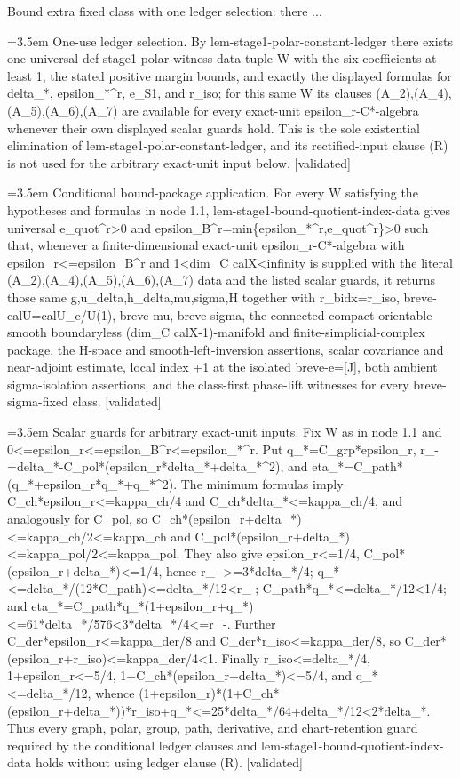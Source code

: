 \documentclass{article}
\newcommand{\step}[1]{\par\noindent\hangindent=3.5em\hangafter=1%
  \makebox[3.5em][l]{\textbf{#1.}}}
\newcommand{\steptag}[1]{\hfill{\small\textsf{[#1]}}}
\begin{document}
\begin{proofbox}{Bound extra fixed class with one ledger selection: there ...}
\step{1.1} One-use ledger selection. By lem-stage1-polar-constant-ledger there exists one universal def-stage1-polar-witness-data tuple W with the six coefficients at least 1, the stated positive margin bounds, and exactly the displayed formulas for delta\_*, epsilon\_*\textasciicircum{}r, e\_S1, and r\_iso; for this same W its clauses (A\_2),(A\_4),(A\_5),(A\_6),(A\_7) are available for every exact-unit epsilon\_r-C*-algebra whenever their own displayed scalar guards hold. This is the sole existential elimination of lem-stage1-polar-constant-ledger, and its rectified-input clause (R) is not used for the arbitrary exact-unit input below. \steptag{validated} \\[4pt]
\step{1.2} Conditional bound-package application. For every W satisfying the hypotheses and formulas in node 1.1, lem-stage1-bound-quotient-index-data gives universal e\_quot\textasciicircum{}r>0 and epsilon\_B\textasciicircum{}r=min\{epsilon\_*\textasciicircum{}r,e\_quot\textasciicircum{}r\}>0 such that, whenever a finite-dimensional exact-unit epsilon\_r-C*-algebra with epsilon\_r<=epsilon\_B\textasciicircum{}r and 1<dim\_C calX<infinity is supplied with the literal (A\_2),(A\_4),(A\_5),(A\_6),(A\_7) data and the listed scalar guards, it returns those same g,u\_delta,h\_delta,mu,sigma,H together with r\_bidx=r\_iso, breve-calU=calU\_e/U(1), breve-mu, breve-sigma, the connected compact orientable smooth boundaryless (dim\_C calX-1)-manifold and finite-simplicial-complex package, the H-space and smooth-left-inversion assertions, scalar covariance and near-adjoint estimate, local index +1 at the isolated breve-e=[J], both ambient sigma-isolation assertions, and the class-first phase-lift witnesses for every breve-sigma-fixed class. \steptag{validated} \\[4pt]
\step{1.3} Scalar guards for arbitrary exact-unit inputs. Fix W as in node 1.1 and 0<=epsilon\_r<=epsilon\_B\textasciicircum{}r<=epsilon\_*\textasciicircum{}r. Put q\_*=C\_grp*epsilon\_r, r\_-=delta\_*-C\_pol*(epsilon\_r*delta\_*+delta\_*\textasciicircum{}2), and eta\_*=C\_path*(q\_*+epsilon\_r*q\_*+q\_*\textasciicircum{}2). The minimum formulas imply C\_ch*epsilon\_r<=kappa\_ch/4 and C\_ch*delta\_*<=kappa\_ch/4, and analogously for C\_pol, so C\_ch*(epsilon\_r+delta\_*)<=kappa\_ch/2<=kappa\_ch and C\_pol*(epsilon\_r+delta\_*)<=kappa\_pol/2<=kappa\_pol. They also give epsilon\_r<=1/4, C\_pol*(epsilon\_r+delta\_*)<=1/4, hence r\_- >=3*delta\_*/4; q\_*<=delta\_*/(12*C\_path)<=delta\_*/12<r\_-; C\_path*q\_*<=delta\_*/12<1/4; and eta\_*=C\_path*q\_*(1+epsilon\_r+q\_*)<=61*delta\_*/576<3*delta\_*/4<=r\_-. Further C\_der*epsilon\_r<=kappa\_der/8 and C\_der*r\_iso<=kappa\_der/8, so C\_der*(epsilon\_r+r\_iso)<=kappa\_der/4<1. Finally r\_iso<=delta\_*/4, 1+epsilon\_r<=5/4, 1+C\_ch*(epsilon\_r+delta\_*)<=5/4, and q\_*<=delta\_*/12, whence (1+epsilon\_r)*(1+C\_ch*(epsilon\_r+delta\_*))*r\_iso+q\_*<=25*delta\_*/64+delta\_*/12<2*delta\_*. Thus every graph, polar, group, path, derivative, and chart-retention guard required by the conditional ledger clauses and lem-stage1-bound-quotient-index-data holds without using ledger clause (R). \steptag{validated} \\[4pt]

\end{proofbox}
\end{document}
